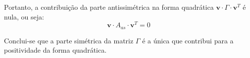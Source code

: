 \documentclass[10pt]{article}
\begin{document}
Portanto, a contribuição da parte antissimétrica na forma quadrática $\mathbf{v} \cdot \Gamma \cdot \mathbf{v}^T$ é nula, ou seja:
\begin{equation}
    \mathbf{v} \cdot A_{as} \cdot \mathbf{v}^T = 0
\end{equation}

Conclui-se que a parte simétrica da matriz $\Gamma$ é a única que contribui para a positividade da forma quadrática.
\end{document}
